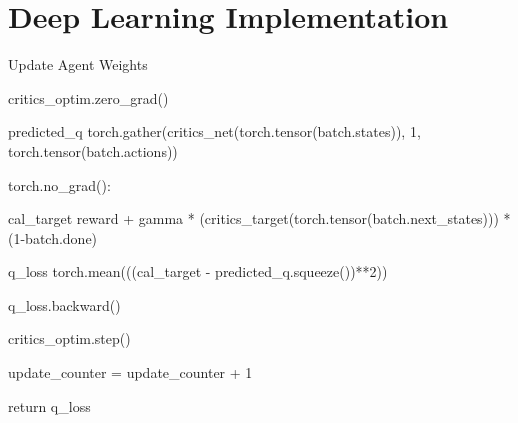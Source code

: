 \documentclass[logo,msc]{infthesis}           %
\begin{document}
\chapter{Deep Learning Implementation}

\begin{algorithm}[H]
\caption{Update Agent Weights}\label{alg:weights_update}

critics\_optim.zero\_grad()

predicted\_q \gets torch.gather(critics\_net(torch.tensor(batch.states)), 1, torch.tensor(batch.actions))

torch.no\_grad():

cal\_target \gets reward + gamma * (critics\_target(torch.tensor(batch.next\_states))) * (1-batch.done)
    
q\_loss \gets torch.mean(((cal\_target - predicted\_q.squeeze())**2))

q\_loss.backward()

critics\_optim.step()

update\_counter \gets = update\_counter + 1

    
return q\_loss
\end{algorithm}
\end{document}
